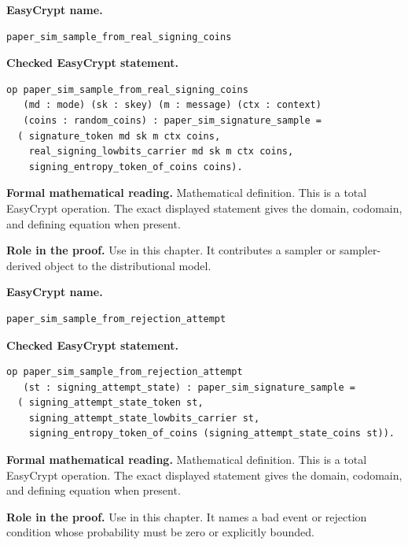 \begin{formaldefinition}
\noindent\textbf{EasyCrypt name.}
\begin{lstlisting}[language=EasyCrypt,basicstyle=\ttfamily\scriptsize]
paper_sim_sample_from_real_signing_coins
\end{lstlisting}
\noindent\textbf{Checked EasyCrypt statement.}
\begin{lstlisting}[language=EasyCrypt,basicstyle=\ttfamily\scriptsize]
op paper_sim_sample_from_real_signing_coins
   (md : mode) (sk : skey) (m : message) (ctx : context)
   (coins : random_coins) : paper_sim_signature_sample =
  ( signature_token md sk m ctx coins,
    real_signing_lowbits_carrier md sk m ctx coins,
    signing_entropy_token_of_coins coins).
\end{lstlisting}
\noindent\textbf{Formal mathematical reading.}
Mathematical definition. This is a total EasyCrypt operation.  The exact displayed statement gives the domain, codomain, and defining equation when present.

\noindent\textbf{Role in the proof.}
Use in this chapter. It contributes a sampler or sampler-derived object to the distributional model.

\end{formaldefinition}

\begin{formaldefinition}
\noindent\textbf{EasyCrypt name.}
\begin{lstlisting}[language=EasyCrypt,basicstyle=\ttfamily\scriptsize]
paper_sim_sample_from_rejection_attempt
\end{lstlisting}
\noindent\textbf{Checked EasyCrypt statement.}
\begin{lstlisting}[language=EasyCrypt,basicstyle=\ttfamily\scriptsize]
op paper_sim_sample_from_rejection_attempt
   (st : signing_attempt_state) : paper_sim_signature_sample =
  ( signing_attempt_state_token st,
    signing_attempt_state_lowbits_carrier st,
    signing_entropy_token_of_coins (signing_attempt_state_coins st)).
\end{lstlisting}
\noindent\textbf{Formal mathematical reading.}
Mathematical definition. This is a total EasyCrypt operation.  The exact displayed statement gives the domain, codomain, and defining equation when present.

\noindent\textbf{Role in the proof.}
Use in this chapter. It names a bad event or rejection condition whose probability must be zero or explicitly bounded.

\end{formaldefinition}

